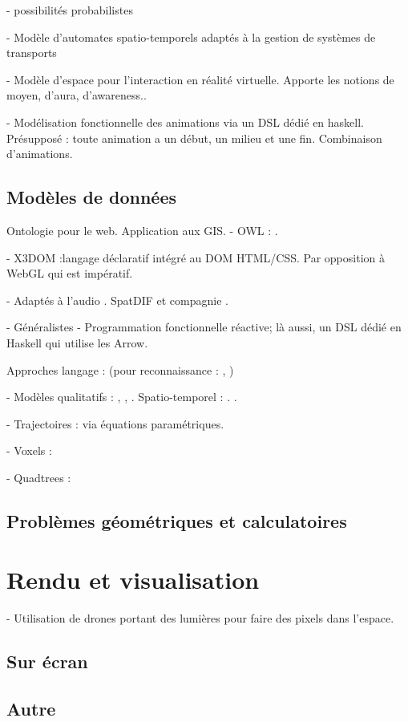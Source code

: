 \documentclass[french,12pt]{article}
\begin{document}
- possibilités probabilistes

- Modèle d'automates spatio-temporels adaptés à la gestion de systèmes de transports %
\cite{zhang_timed_2014}

- Modèle d'espace pour l'interaction en réalité virtuelle. Apporte les notions de moyen, d'aura, d'awareness..
\cite{benford_spatial_1993}

- Modélisation fonctionnelle des animations via un DSL dédié en haskell. Présupposé : toute animation a un début, un milieu et une fin. Combinaison d'animations.
\cite{matlage_every_2011}

\subsection{Modèles de données}
Ontologie pour le web. Application aux \ac{GIS}.
- OWL : \cite{mefteh_approche_2013}.

- X3DOM :langage déclaratif intégré au DOM HTML/CSS\cite{jankowski_declarative_2013}. Par opposition à WebGL qui est impératif.

- Adaptés à l'audio
. SpatDIF et compagnie \cite{peters_spatial_2013}\cite{kendall_towards_2008}
. \cite{kondoz_object-based_2014}

- Généralistes
- Programmation fonctionnelle réactive; là aussi, un DSL dédié en Haskell qui utilise les Arrow.
\cite{hudak_arrows_2003}

Approches langage : (pour reconnaissance : \cite{spranger_recruitment_2011}\cite{spranger_emergent_2012}, )

- Modèles qualitatifs : \cite{chen_survey_2015}, \cite{bhatt_geospatial_2014}, \cite{schlieder_qualitative_1996,dorr_qualitative_2014}. Spatio-temporel : \cite{hazarika_qualitative_2012}. \cite{clementini_global_1997}.

- Trajectoires : via équations paramétriques.

- Voxels : \cite{kaufman_volume_1993}

- Quadtrees : \cite{eppstein_skip_2008}
\subsection{Problèmes géométriques et calculatoires}

\section{Rendu et visualisation}
- Utilisation de drones portant des lumières pour faire des pixels dans l'espace.
\cite{hortner_spaxels_2012}
\subsection{Sur écran}
\subsection{Autre}
\printbibliography
\end{document}
